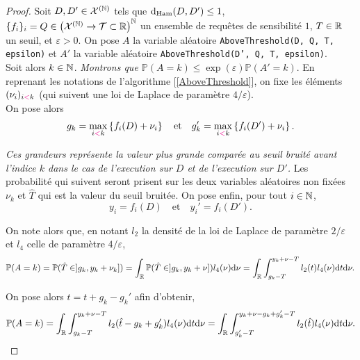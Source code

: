 \begin{proof}
    Soit \(D, D' \in \mathcal X^{(\mathbb{N})}\) tels que \(\mathrm{d}_{\text{Ham}}(D,D') \leq 1\), \(\{f_i\}_i = Q \in \left( \mathcal X^{(\mathbb{N})} \to  \mathcal T \subset \mathbb{R} \right)^{\mathbb{N}}\) un ensemble de requêtes de sensibilité \(1\), \(T \in \mathbb{R}\) un seuil, et \(\varepsilon > 0\). On pose \(A\) la variable aléatoire \texttt{AboveThreshold(D, Q, T, epsilon)} et \(A'\) la variable aléatoire \texttt{AboveThreshold(D', Q, T, epsilon)}.\\

    Soit alors \(k \in \mathbb{N}\). \textit{Montrons que \(\mathbb P (A = k) \leq \exp(\varepsilon)\mathbb P(A' = k)\)}. En reprenant les notations de l'algorithme [\ref{AboveThreshold}], on fixe les éléments \((\nu_i)_{i {\color{magenta} <} k}\) (qui suivent une loi de {\sc Laplace} de paramètre \(4/\varepsilon\)).\\


    On pose alors
    \[
        g_k = \max_{i {\color{magenta} <} k} \left\{ f_i(D) + \nu_i\right\} \quad \text{et} \quad g_k' = \max_{i {\color{magenta} <} k} \left\{ f_i(D') + \nu_i\right\}.  
    \]

    \textit{Ces grandeurs représente la valeur plus grande comparée au seuil bruité avant l'indice \(k\) dans le cas de l'execution sur \(D\) et de l'execution sur \(D'\).} Les probabilité qui suivent seront prisent sur les deux variables aléatoires non fixées \(\nu_k\) et \(\hat T\) qui est la valeur du seuil bruitée. On pose enfin, pour tout \(i \in \mathbb{N}\),
    \[
        y_i = f_i(D) \quad \text{et} \quad y_i' = f_i(D'). 
    \]


    On note alors que, en notant \(l_2\) la densité de la loi de {\sc Laplace} de paramètre \(2/\varepsilon\) et \(l_4\) celle de paramètre \(4/\varepsilon\),
    \begin{align*}
        \mathbb P(A = k) = \mathbb P(\hat T \in ]g_k, y_k + \nu_k]) = \int_{\mathbb{R}} \mathbb P(\hat T \in ]g_k, y_k + \nu])l_4(\nu) \mathrm{d} \nu = \int_{\mathbb{R}}\int_{g_k - T}^{y_k + \nu - T} l_2(t)l_4(\nu) \mathrm{d} t \mathrm{d} \nu.
    \end{align*}

    On pose alors \(\hat t = t + g_k - g_k'\) afin d'obtenir,
    \begin{align*}
        \mathbb P(A = k) = \int_{\mathbb{R}}\int_{g_k- T}^{y_k + \nu - T} l_2(\hat t - g_k + g_k')l_4(\nu) \mathrm{d}  t \mathrm{d} \nu = \int_{\mathbb{R}}\int_{g_k' - T}^{y_k + \nu - g_k + g_k' - T} l_2(\hat t )l_4(\nu) \mathrm{d}  t \mathrm{d} \nu.
    \end{align*}


\end{proof}
